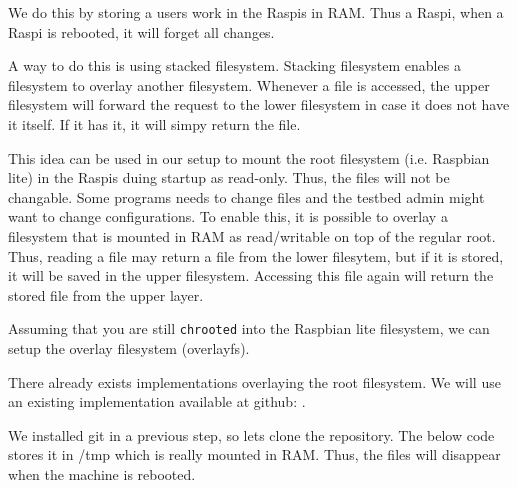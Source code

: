 We do this by storing a users work in the \ac{Raspi}s in \ac{RAM}. Thus a
\ac{Raspi}, when a \ac{Raspi} is rebooted, it will forget all changes.

A way to do this is using stacked filesystem. Stacking filesystem enables
a filesystem to overlay another filesystem. Whenever a file is accessed,
the upper filesystem will forward the request to the lower filesystem in
case it does not have it itself. If it has it, it will simpy return the file.

This idea can be used in our setup to mount the root filesystem (i.e. Raspbian
lite) in the \ac{Raspi}s duing startup as read-only. Thus, the files will not
be changable. Some programs needs to change files and the testbed admin might
want to change configurations. To enable this, it is possible to
overlay a filesystem that is mounted in \ac{RAM} as read/writable on top of
the regular root. Thus, reading a file may return a file from the lower filesytem,
but if it is stored, it will be saved in the upper filesystem. Accessing this file
again will return the stored file from the upper layer.



%
%
%
%

Assuming that you are still \texttt{chrooted} into the Raspbian lite filesystem, we
can setup the overlay filesystem (overlayfs).

There already exists implementations overlaying the root filesystem. We will
use an existing implementation
available at github: \cite{overlayroot}.

We installed git in a previous step, so lets clone the repository. The below
code stores it in /tmp which is really mounted in \ac{RAM}. Thus, the files
will disappear when the machine is rebooted.

